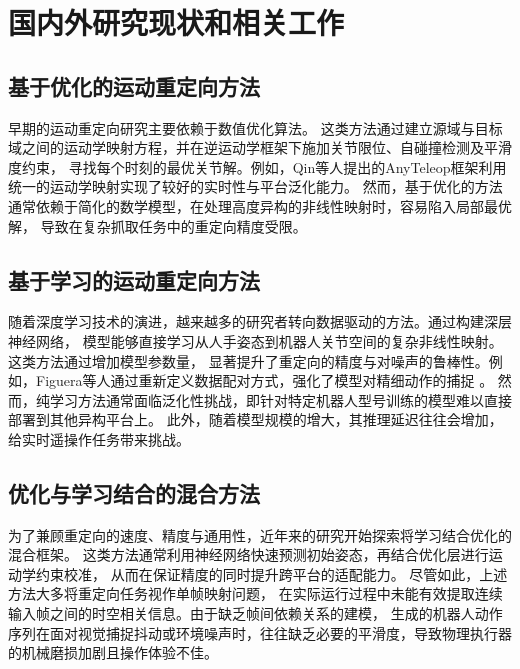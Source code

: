 \section{国内外研究现状和相关工作}
\label{sec:related_work}
\subsection{基于优化的运动重定向方法}
早期的运动重定向研究主要依赖于数值优化算法。
这类方法通过建立源域与目标域之间的运动学映射方程，并在逆运动学框架下施加关节限位、自碰撞检测及平滑度约束，
寻找每个时刻的最优关节解。例如，Qin等人提出的AnyTeleop框架利用统一的运动学映射实现了较好的实时性与平台泛化能力。
然而，基于优化的方法通常依赖于简化的数学模型，在处理高度异构的非线性映射时，容易陷入局部最优解，
导致在复杂抓取任务中的重定向精度受限。

\subsection{基于学习的运动重定向方法}
随着深度学习技术的演进，越来越多的研究者转向数据驱动的方法。通过构建深层神经网络，
模型能够直接学习从人手姿态到机器人关节空间的复杂非线性映射。这类方法通过增加模型参数量，
显著提升了重定向的精度与对噪声的鲁棒性。例如，Figuera等人通过重新定义数据配对方式，强化了模型对精细动作的捕捉
\cite{figueraRedefiningDataPairing2024a}。
然而，纯学习方法通常面临泛化性挑战，即针对特定机器人型号训练的模型难以直接部署到其他异构平台上。
此外，随着模型规模的增大，其推理延迟往往会增加，给实时遥操作任务带来挑战。

\subsection{优化与学习结合的混合方法}
为了兼顾重定向的速度、精度与通用性，近年来的研究开始探索将学习结合优化的混合框架。
这类方法通常利用神经网络快速预测初始姿态，再结合优化层进行运动学约束校准，
从而在保证精度的同时提升跨平台的适配能力\cite{zhangKinematicMotionRetargeting2022}。
尽管如此，上述方法大多将重定向任务视作单帧映射问题，
在实际运行过程中未能有效提取连续输入帧之间的时空相关信息。由于缺乏帧间依赖关系的建模，
生成的机器人动作序列在面对视觉捕捉抖动或环境噪声时，往往缺乏必要的平滑度，导致物理执行器的机械磨损加剧且操作体验不佳。

